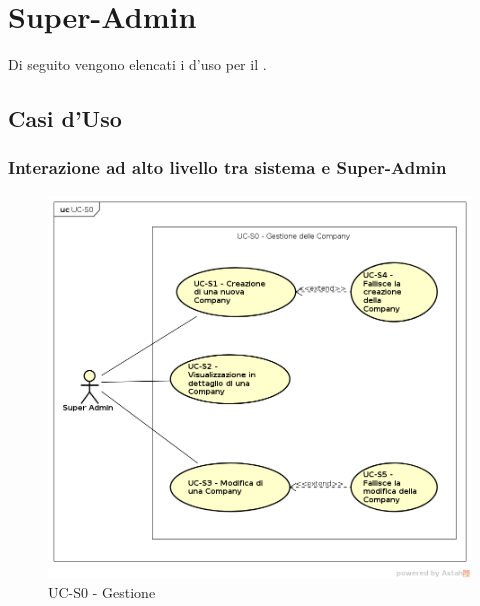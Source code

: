 \section{Super-Admin}

Di seguito vengono elencati i  d'uso per il .


\subsection{Casi d'Uso}

\subsubsection{Interazione ad alto livello tra sistema e Super-Admin}

    \begin{figure}[h]
      \begin{center}
        \includegraphics[width=12cm]{res/img/UCSuperadmin/UC-S0.png}
      \caption{UC-S0 - Gestione }
      \end{center} 
    \end{figure}    
    
